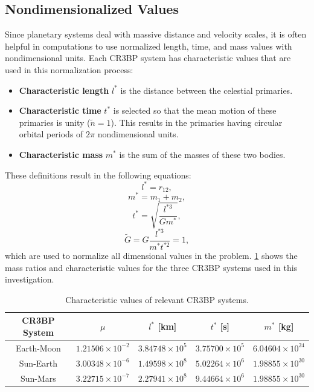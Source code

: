 \subsection{Nondimensionalized Values}
Since planetary systems deal with massive distance and velocity scales, it is often helpful in
computations to use normalized length, time, and mass values with nondimensional units. Each CR3BP
system has characteristic values that are used in this normalization process:
\begin{itemize}
    \item \textbf{Characteristic length} $l^{*}$ is the distance between the celestial primaries.
    \item \textbf{Characteristic time} $t^{*}$ is selected so that the mean motion of these
    primaries is unity ($\tilde{n}=1$). This results in the primaries having circular orbital
    periods of $2\pi$ nondimensional units.
    \item \textbf{Characteristic mass} $m^{*}$ is the sum of the masses of these two bodies.
\end{itemize}
These definitions result in the following equations:
\begin{equation}
    l^{*}=r_{12},
    \label{eq:lstar}
\end{equation}
\begin{equation}
    m^{*}=m_{1}+m_{2},
    \label{eq:mstar}
\end{equation}
\begin{equation}
    t^{*}=\sqrt{\frac{l^{*3}}{Gm^{*}}},
    \label{eq:tstar}
\end{equation}
\begin{equation}
    \tilde{G}=G\frac{l^{*3}}{m^{*}t^{*2}}=1,
    \label{eq:gstar}
\end{equation}
which are used to normalize all dimensional values in the problem. \cref{tab:charValues} shows the
mass ratios and characteristic values for the three CR3BP systems used in this investigation.

\begin{table}[ht]
    \centering
    \caption{Characteristic values of relevant CR3BP systems.}
    \begin{tabular}{|c|c|c|c|c|}
        \hline
        \textbf{CR3BP System}   &   \boldmath$\mu$          &   \boldmath$l^{*}$ \textbf{[km]}  &   \boldmath$t^{*}$ \textbf{[s]}   &   \boldmath$m^{*}$ \textbf{[kg]}  \\  \hline
        Earth-Moon              &   $1.21506\times10^{-2}$  &   $3.84748\times10^{5}$           &   $3.75700\times10^{5}$           &   $6.04604\times10^{24}$          \\  \hline
        Sun-Earth               &   $3.00348\times10^{-6}$  &   $1.49598\times10^{8}$           &   $5.02264\times10^{6}$           &   $1.98855\times10^{30}$          \\  \hline
        Sun-Mars                &   $3.22715\times10^{-7}$  &   $2.27941\times10^{8}$           &   $9.44664\times10^{6}$           &   $1.98855\times10^{30}$          \\  \hline
    \end{tabular}
    \label{tab:charValues}
\end{table}

